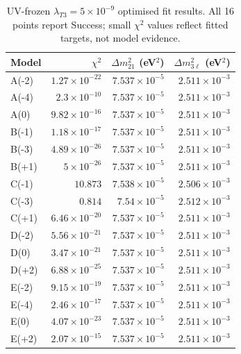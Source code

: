 \begin{table}[htbp]
\centering
\caption{UV-frozen $\lambda_{T3}=5\times10^{-9}$ optimised fit results. All 16 points report Success; small $\chi^2$ values reflect fitted targets, not model evidence.}
\label{tab:t3-uv-frozen-fits}
\begin{tabular}{lrrr}
\toprule
Model & $\chi^2$ & $\Delta m_{21}^2$ (eV$^2$) & $\Delta m_{3\ell}^2$ (eV$^2$) \\
\midrule
A(-2) & $1.27\times10^{-22}$ & $7.537\times10^{-5}$ & $2.511\times10^{-3}$ \\
A(-4) & $2.3\times10^{-10}$ & $7.537\times10^{-5}$ & $2.511\times10^{-3}$ \\
A(0) & $9.82\times10^{-16}$ & $7.537\times10^{-5}$ & $2.511\times10^{-3}$ \\
B(-1) & $1.18\times10^{-17}$ & $7.537\times10^{-5}$ & $2.511\times10^{-3}$ \\
B(-3) & $4.89\times10^{-26}$ & $7.537\times10^{-5}$ & $2.511\times10^{-3}$ \\
B(+1) & $5\times10^{-26}$ & $7.537\times10^{-5}$ & $2.511\times10^{-3}$ \\
C(-1) & $10.873$ & $7.538\times10^{-5}$ & $2.506\times10^{-3}$ \\
C(-3) & $0.814$ & $7.54\times10^{-5}$ & $2.512\times10^{-3}$ \\
C(+1) & $6.46\times10^{-20}$ & $7.537\times10^{-5}$ & $2.511\times10^{-3}$ \\
D(-2) & $5.56\times10^{-21}$ & $7.537\times10^{-5}$ & $2.511\times10^{-3}$ \\
D(0) & $3.47\times10^{-21}$ & $7.537\times10^{-5}$ & $2.511\times10^{-3}$ \\
D(+2) & $6.88\times10^{-25}$ & $7.537\times10^{-5}$ & $2.511\times10^{-3}$ \\
E(-2) & $9.15\times10^{-19}$ & $7.537\times10^{-5}$ & $2.511\times10^{-3}$ \\
E(-4) & $2.46\times10^{-17}$ & $7.537\times10^{-5}$ & $2.511\times10^{-3}$ \\
E(0) & $4.07\times10^{-23}$ & $7.537\times10^{-5}$ & $2.511\times10^{-3}$ \\
E(+2) & $2.07\times10^{-15}$ & $7.537\times10^{-5}$ & $2.511\times10^{-3}$ \\
\bottomrule
\end{tabular}
\end{table}
